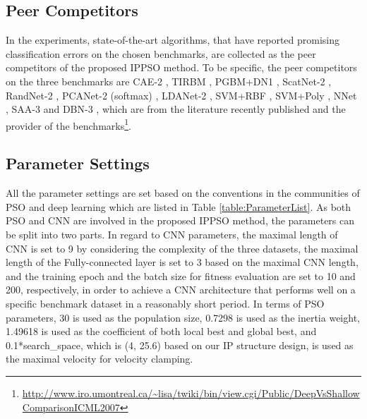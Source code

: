\documentclass[conference]{IEEEtran}
\begin{document}
\subsection{Peer Competitors}\label{secpeer-competitors}

In the experiments, state-of-the-art algorithms, that have reported promising classification errors on the chosen benchmarks, are collected as the peer competitors of the proposed IPPSO method. To be specific, the peer competitors on the three benchmarks are CAE-2 \cite{CAE:Rifai}, TIRBM \cite{TIRBM:Sohn}, PGBM+DN1 \cite{PGBMDN1:Sohn}, ScatNet-2 \cite{ScatteringCNN:Bruna}, RandNet-2 \cite{DLBaseline:Chan}, PCANet-2 (softmax) \cite{DLBaseline:Chan}, LDANet-2 \cite{DLBaseline:Chan}, SVM+RBF \cite{DeepArchitectureEval:Larochelle}, SVM+Poly \cite{DeepArchitectureEval:Larochelle}, NNet \cite{DeepArchitectureEval:Larochelle}, SAA-3 \cite{DeepArchitectureEval:Larochelle} and DBN-3 \cite{DeepArchitectureEval:Larochelle}, which are from the literature \cite{DLBaseline:Chan} recently published and the provider of the benchmarks\footnote{\url{http://www.iro.umontreal.ca/~lisa/twiki/bin/view.cgi/Public/DeepVsShallowComparisonICML2007}}.

\subsection{Parameter Settings}

All the parameter settings are set based on the conventions in the communities of PSO \cite{PSOEPSettings:Van} and deep learning \cite{DLGuide:Hinton} which are listed in Table \ref{table:ParameterList}. As both PSO and CNN are involved in the proposed IPPSO method, the parameters can be split into two parts. In regard to CNN parameters, the maximal length of CNN is set to 9 by considering the complexity of the three datasets, the maximal length of the Fully-connected layer is set to 3 based on the maximal CNN length, and the training epoch and the batch size for fitness evaluation are set to 10 and 200, respectively, in order to achieve a CNN architecture that performs well on a specific benchmark dataset in a reasonably short period. In terms of PSO parameters, 30 is used as the population size, 0.7298 is used as the inertia weight, 1.49618 is used as the coefficient of both local best and global best, and 0.1*search\_space, which is (4, 25.6) based on our IP structure design, is used as the maximal velocity for velocity clamping. 
\end{document}
